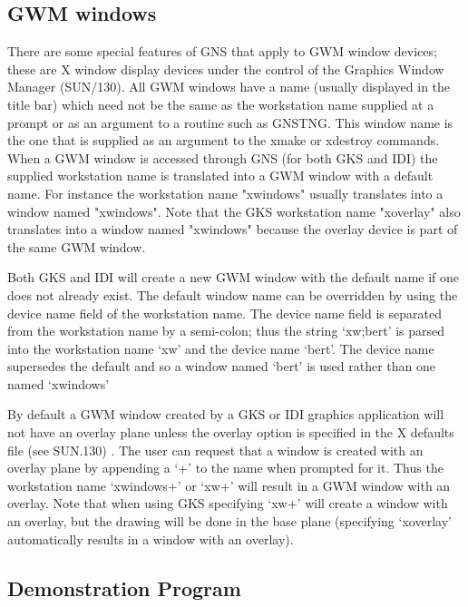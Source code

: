 \documentclass[twoside,11pt]{article}
\newcommand{\htmlref}[2]{#1}
\newenvironment{latexonly}{}{}
\newcommand{\xref}[3]{#1}
\renewcommand{\_}{\texttt{\symbol{95}}}
\begin{document}
\subsection{GWM windows}

There are some special features of GNS that apply to GWM window devices;
these are X window display devices under the control of the Graphics
Window Manager (\xref{SUN/130}{sun130}{}).
All GWM windows have a name (usually displayed in the title
bar) which need not be the same as the workstation name supplied at a prompt
or as an argument to a routine such as
\htmlref{GNS\_TNG}{GNS_TNG}. This window name is the one
that is supplied as an argument to the
\xref{xmake}{sun130}{xmakeCommand} or
\xref{xdestroy}{sun130}{xdestroyCommand} commands. When a
GWM window is accessed through GNS (for both GKS and IDI) the supplied
workstation name is translated into a GWM window with a default name. For
instance the workstation name "xwindows" usually translates into a window
named "xwindows". Note that the GKS workstation name "xoverlay" also
translates into a window named "xwindows" because the overlay device is part
of the same GWM window.

Both GKS and IDI will create a new GWM window with the default name
if one does not already exist. The default window name can be overridden
by using the device name field of the workstation name. The device name
field is separated from the workstation name by a semi-colon; thus the
string `xw;bert' is parsed into the workstation name `xw' and the device
name `bert'. The device name supersedes the default and so a window
named `bert' is used rather than one named `xwindows'

By default a GWM window created by a GKS or IDI graphics application
will not have an overlay plane unless the overlay option is specified
in the \xref{X defaults file}{sun130}{xdefaults}
\begin{latexonly}
(see SUN.130)
\end{latexonly}.
The user can request that a window is created
with an overlay plane by appending a `+' to the name when prompted for
it. Thus the workstation name `xwindows+' or `xw+' will result in a
GWM window with an overlay. Note that when using GKS specifying `xw+'
will create a window with an overlay, but the drawing will be done in
the base plane (specifying `xoverlay' automatically results in a window
with an overlay).

\subsection{Demonstration Program}\label{demo-prog}
\end{document}
